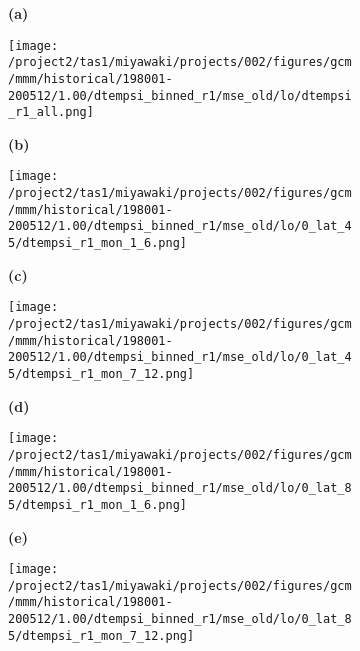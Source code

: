 \documentclass[preview]{standalone}
\begin{document}

% 


\begin{figure}

  \begin{subfigure}[t]{0.05\textwidth}
    \textbf{\normalsize{(a)}}
  \end{subfigure}
  \begin{subfigure}[t]{0.95\textwidth}
    \texttt{[image: /project2/tas1/miyawaki/projects/002/figures/gcm/mmm/historical/198001-200512/1.00/dtempsi\_binned\_r1/mse\_old/lo/dtempsi\_r1\_all.png]}
  \end{subfigure}

  \begin{subfigure}[t]{0.05\textwidth}
    \textbf{\normalsize{(b)}}
  \end{subfigure}
  \begin{subfigure}[t]{0.45\textwidth}
    \texttt{[image: /project2/tas1/miyawaki/projects/002/figures/gcm/mmm/historical/198001-200512/1.00/dtempsi\_binned\_r1/mse\_old/lo/0\_lat\_45/dtempsi\_r1\_mon\_1\_6.png]}
  \end{subfigure}
  \begin{subfigure}[t]{0.05\textwidth}
    \textbf{\normalsize{(c)}}
  \end{subfigure}
  \begin{subfigure}[t]{0.45\textwidth}
    \texttt{[image: /project2/tas1/miyawaki/projects/002/figures/gcm/mmm/historical/198001-200512/1.00/dtempsi\_binned\_r1/mse\_old/lo/0\_lat\_45/dtempsi\_r1\_mon\_7\_12.png]}
  \end{subfigure}

  \begin{subfigure}[t]{0.05\textwidth}
    \textbf{\normalsize{(d)}}
  \end{subfigure}
  \begin{subfigure}[t]{0.45\textwidth}
    \texttt{[image: /project2/tas1/miyawaki/projects/002/figures/gcm/mmm/historical/198001-200512/1.00/dtempsi\_binned\_r1/mse\_old/lo/0\_lat\_85/dtempsi\_r1\_mon\_1\_6.png]}
  \end{subfigure}
  \begin{subfigure}[t]{0.05\textwidth}
    \textbf{\normalsize{(e)}}
  \end{subfigure}
  \begin{subfigure}[t]{0.45\textwidth}
    \texttt{[image: /project2/tas1/miyawaki/projects/002/figures/gcm/mmm/historical/198001-200512/1.00/dtempsi\_binned\_r1/mse\_old/lo/0\_lat\_85/dtempsi\_r1\_mon\_7\_12.png]}
  \end{subfigure}

\end{figure}
\end{document}
